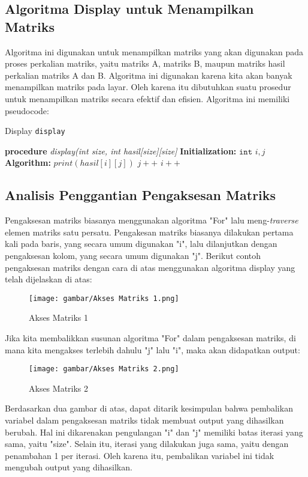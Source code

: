 \documentclass[conference]{IEEEtran}
\begin{document}
\subsection{Algoritma Display untuk Menampilkan Matriks}
Algoritma ini digunakan untuk menampilkan matriks yang akan digunakan pada proses perkalian
matriks, yaitu matriks A, matriks B, maupun matriks hasil perkalian matriks A dan B. Algoritma ini
digunakan karena kita akan banyak menampilkan matriks pada layar. Oleh karena itu dibutuhkan suatu
prosedur untuk menampilkan matriks secara efektif dan efisien. Algoritma ini memiliki pseudocode:

\begin{algorithm}
    \caption{Display \texttt{display}}\label{alg:four}
    \DontPrintSemicolon
    \textbf{procedure} \emph{display(int size, int hasil[size][size]}\;
    \textbf{Initialization:}\;
    $ \texttt{int } i,j $\;
    \textbf{Algorithm:}\;
     {
         {
            $print(hasil[i][j])$\;
            $j++$\;
        }
        $i++$\;
    }
\end{algorithm}

\subsection{Analisis Penggantian Pengaksesan Matriks}
Pengaksesan matriks biasanya menggunakan algoritma "For" lalu
meng-\emph{traverse} elemen matriks satu persatu. Pengakesan matriks biasanya 
dilakukan pertama kali pada baris, yang secara umum digunakan "i", lalu
dilanjutkan dengan pengaksesan kolom, yang secara umum digunakan "j". Berikut
contoh pengaksesan matriks dengan cara di atas menggunakan algoritma display
yang telah dijelaskan di atas:

\begin{figure} [htbp]
    \texttt{[image: gambar/Akses Matriks 1.png]}
    \centering
    \caption{Akses Matriks 1}
\end{figure}

Jika kita membalikkan susunan algoritma "For" dalam pengaksesan matriks, di mana
kita mengakses terlebih dahulu "j" lalu "i", maka akan didapatkan output:

\begin{figure} [htbp]
    \texttt{[image: gambar/Akses Matriks 2.png]}
    \centering
    \caption{Akses Matriks 2}
\end{figure}

Berdasarkan dua gambar di atas, dapat ditarik kesimpulan bahwa pembalikan variabel
dalam pengaksesan matriks tidak membuat output yang dihasilkan berubah. Hal ini dikarenakan
pengulangan "i" dan "j" memiliki batas iterasi yang sama, yaitu "size". Selain itu, iterasi
yang dilakukan juga sama, yaitu dengan penambahan 1 per iterasi. Oleh karena itu, pembalikan
variabel ini tidak mengubah output yang dihasilkan.
\end{document}
